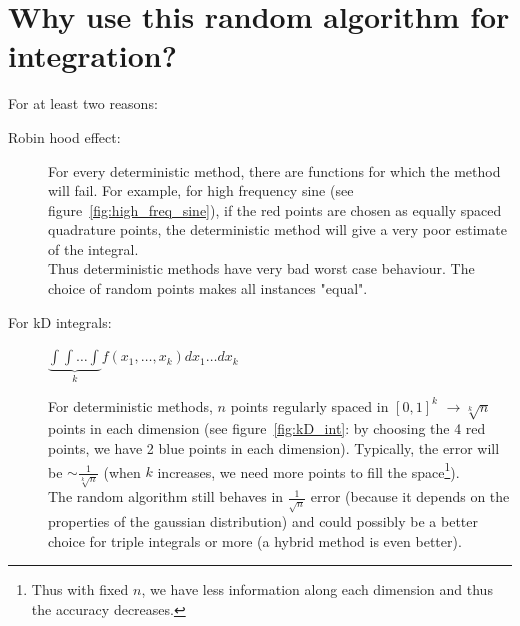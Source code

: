 \section{Why use this random algorithm for integration?}
For at least two reasons:
\begin{description}
\item[Robin hood effect: ] For every deterministic method, there are functions for which the method will fail. For example, for high frequency sine (see figure~\ref{fig:high_freq_sine}), if the red points are chosen as equally spaced quadrature points, the deterministic method will give a very poor estimate of the integral.\\

Thus deterministic methods have very bad worst case behaviour. The choice of random points makes all instances "equal".
\item[For kD integrals: ] $\underbrace{\int \int \hdots \int}_{k} f(x_1,\hdots,x_k)dx_1\hdots dx_{k}$

For deterministic methods, $n$ points regularly spaced in $[0,1]^k$ $\rightarrow \sqrt[k]{n}$ points in each dimension (see figure~\ref{fig:kD_int}: by choosing the 4 red points, we have 2 blue points in each dimension). Typically, the error will be $\sim \frac{1}{\sqrt[k]{n}}$ (when $k$ increases, we need more points to fill the space\footnote{Thus with fixed $n$, we have less information along each dimension and thus the accuracy decreases.}).\\

The random algorithm still behaves in $\frac{1}{\sqrt{n}}$ error (because it depends on the properties of the gaussian distribution) and could possibly be a better choice for triple integrals or more (a hybrid method is even better).
\end{description}

